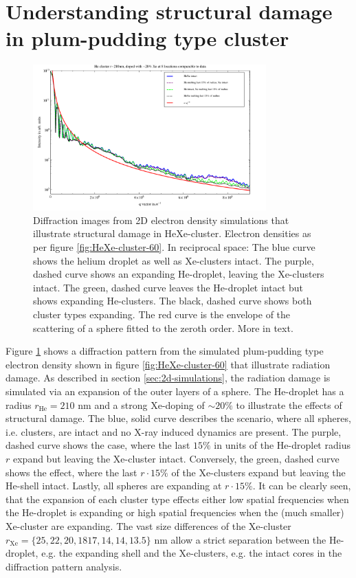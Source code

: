 \section{Understanding structural damage in plum-pudding type cluster}\label{sec:helium-xenon-data}
\begin{figure}
	\centering
		\includegraphics[width=0.80\textwidth]{images/results/simulations-damage-explain.pdf}
	\caption[Simulated structural damage scenarios in HeXe-cluster]{Diffraction images from 2D electron density simulations that illustrate structural damage in HeXe-cluster. Electron densities as per figure \ref{fig:HeXe-cluster-60}. In reciprocal space: The blue curve shows the helium droplet as well as Xe-clusters intact. The purple, dashed curve shows an expanding He-droplet, leaving the Xe-clusters intact. The green, dashed curve leaves the He-droplet intact but shows expanding He-clusters. The black, dashed curve shows both cluster types expanding. The red curve is the envelope of the scattering of a sphere fitted to the zeroth order. More in text.}
	\label{fig:simulations-damage-explain}
\end{figure}
Figure \ref{fig:simulations-damage-explain} shows a diffraction pattern from the simulated plum-pudding type electron density shown in figure \ref{fig:HeXe-cluster-60} that illustrate radiation damage. As described in section \ref{sec:2d-simulations}, the radiation damage is simulated via an expansion of the outer layers of a sphere. The He-droplet has a radius $r_{\text{He}}=210$ nm and a strong Xe-doping of $\sim 20 \%$ to illustrate the effects of structural damage. The blue, solid curve describes the scenario, where all spheres, i.e. clusters, are intact and no X-ray induced dynamics are present. The purple, dashed curve shows the case, where the last $15 \%$ in units of the He-droplet radius $r$ expand but leaving the Xe-cluster intact. Conversely, the green, dashed curve shows the effect, where the last $r\cdot 15 \%$ of the Xe-clusters expand but leaving the He-shell intact. Lastly, all spheres are expanding at $r\cdot 15 \%$. It can be clearly seen, that the expansion of each cluster type effects either low spatial frequencies when the He-droplet is expanding or high spatial frequencies when the (much smaller) Xe-cluster are expanding. The vast size differences of the Xe-cluster $r_{\text{Xe}}=\{25, 22, 20, 18 17, 14, 14, 13.5\}$ nm allow a strict separation between the He-droplet, e.g. the expanding shell and the Xe-clusters, e.g. the intact cores in the diffraction pattern analysis.\\
